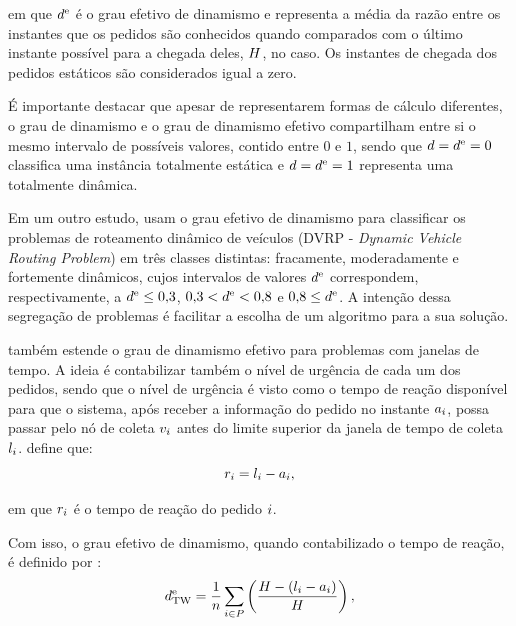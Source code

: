 \noindent em que $d^\text{e}$ é o grau efetivo de dinamismo e 
representa a média da razão entre os instantes que os pedidos são conhecidos 
quando comparados com o último instante possível para a chegada deles, 
$H$, no caso. Os instantes de chegada dos pedidos estáticos são 
considerados igual a zero.

É importante destacar que apesar de representarem formas de cálculo diferentes,
o grau de dinamismo e o grau de dinamismo efetivo compartilham entre si o mesmo
intervalo de possíveis valores, contido entre $0$ e $1$, sendo que
$d = d^\text{e} = 0$ classifica uma instância
totalmente estática e $d = d^\text{e} = 1$ representa
uma totalmente dinâmica.

Em um outro estudo,  usam o grau efetivo
de dinamismo para classificar os problemas de roteamento dinâmico de veículos
(DVRP - \textit{Dynamic Vehicle Routing Problem}) em três classes distintas:
fracamente, moderadamente e fortemente dinâmicos, cujos intervalos de valores 
$d^\text{e}$ correspondem, respectivamente, a $d^\text{e} \leq
0{,}3$, $0{,}3  < d^\text{e} < 0{,}8$ e $0{,}8 \leq
d^\text{e}$.
A intenção dessa segregação de problemas é facilitar a escolha de um algoritmo
para a sua solução.

 também estende o grau de dinamismo efetivo
para problemas com janelas de tempo.
A ideia é contabilizar também o nível de urgência de cada um dos pedidos, 
sendo que o nível de urgência é visto como o tempo de reação disponível
para que o sistema, após receber a informação do pedido no instante
$a_i$, possa passar pelo nó de coleta $v_{i}$
antes do limite superior da janela de tempo de coleta
$l_{i}$.
 define que: 
%
\begin{equation}
  r_i = l_{i}
                           - a_i,
\end{equation}

\noindent em que $r_i$ é o tempo de reação do pedido
$i$.

Com isso, o grau efetivo de dinamismo, quando contabilizado o tempo de reação,
é definido por \cite{larsen_dynamic_2000}:
%
%
\begin{equation}
  d^\text{e}_\text{TW} = 
  \frac{1}{n}
  \sum_{i \in P}
  {
    \left(
    \frac{H - (l_i
                             - a_i)}
         {H}
    \right),
  }
\end{equation}


